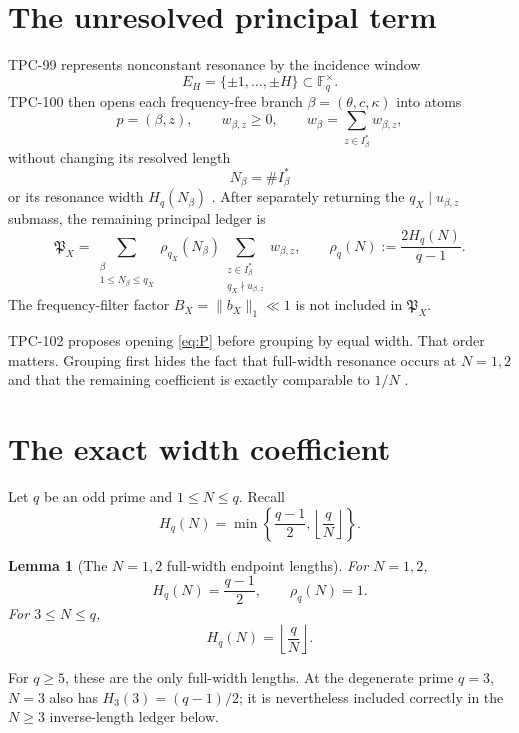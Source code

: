 \documentclass[11pt]{article}
\newtheorem{lemma}[theorem]{Lemma}
\theoremstyle{definition}
\theoremstyle{remark}
\newcommand{\PX}{\mathfrak P_X}
\begin{document}
\section{The unresolved principal term}
\label{sec:introduction}

TPC-99 represents nonconstant resonance by the incidence window
\[
 E_H=\{\pm1,\ldots,\pm H\}\subset\mathbb F_q^\times.
\]
TPC-100 then opens each frequency-free branch
\(\beta=(\theta,c,\kappa)\) into atoms
\[
 p=(\beta,z),\qquad
 w_{\beta,z}\ge0,\qquad
 w_\beta=\sum_{z\in I_\beta^\ast}w_{\beta,z},
\]
without changing its resolved length
\[
 N_\beta=\#I_\beta^\ast
\]
or its resonance width \(H_q(N_\beta)\)
\citep{WangTPC99,WangTPC100}.  After separately returning the
\(q_X\mid u_{\beta,z}\) submass, the remaining principal ledger is
\begin{equation}
 \PX
 =
 \sum_{\substack{\beta\\1\le N_\beta\le q_X}}
 \rho_{q_X}(N_\beta)
 \sum_{\substack{z\in I_\beta^\ast\\q_X\nmid u_{\beta,z}}}
 w_{\beta,z},
\qquad
 \rho_q(N):=\frac{2H_q(N)}{q-1}.
\label{eq:P}
\end{equation}
The frequency-filter factor \(B_X=\|b_X\|_1\ll1\) is not included
in \(\PX\).

TPC-102 proposes opening \eqref{eq:P} before grouping by equal
width.  That order matters.  Grouping first hides the fact that
full-width resonance occurs at \(N=1,2\) and
that the remaining coefficient is exactly comparable to \(1/N\)
\citep{WangTPC101,WangTPC102}.

\section{The exact width coefficient}
\label{sec:coefficient}

Let \(q\) be an odd prime and \(1\le N\le q\).  Recall
\[
 H_q(N)=
 \min\!\left\{\frac{q-1}{2},\left\lfloor\frac qN\right\rfloor\right\}.
\]

\begin{lemma}[The \(N=1,2\) full-width endpoint lengths]
\label{lem:endpoints}
For \(N=1,2\),
\[
 H_q(N)=\frac{q-1}{2},
 \qquad
 \rho_q(N)=1.
\]
For \(3\le N\le q\),
\[
 H_q(N)=\left\lfloor\frac qN\right\rfloor.
\]
\end{lemma}

For \(q\ge5\), these are the only full-width lengths.  At the
degenerate prime \(q=3\), \(N=3\) also has
\(H_3(3)=(q-1)/2\); it is nevertheless included correctly in the
\(N\ge3\) inverse-length ledger below.
\end{document}
